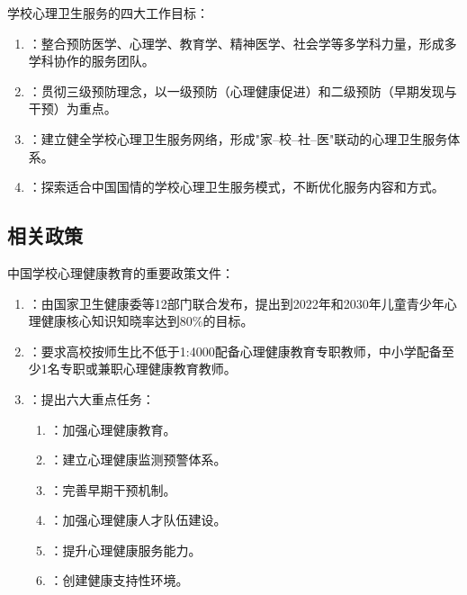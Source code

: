 \begin{keybox}
学校心理卫生服务的四大工作目标：

\begin{enumerate}[leftmargin=*]
    \item {}：整合预防医学、心理学、教育学、精神医学、社会学等多学科力量，形成多学科协作的服务团队。
    \item {}：贯彻三级预防理念，以一级预防（心理健康促进）和二级预防（早期发现与干预）为重点。
    \item {}：建立健全学校心理卫生服务网络，形成"家--校--社--医"联动的心理卫生服务体系。
    \item {}：探索适合中国国情的学校心理卫生服务模式，不断优化服务内容和方式。
\end{enumerate}
\end{keybox}

\subsection{相关政策}

\begin{defbox}
中国学校心理健康教育的重要政策文件：

\begin{enumerate}[leftmargin=*]
    \item {}：由国家卫生健康委等12部门联合发布，提出到2022年和2030年儿童青少年心理健康核心知识知晓率达到80\%的目标。
    \item {}：要求高校按师生比不低于1:4000配备心理健康教育专职教师，中小学配备至少1名专职或兼职心理健康教育教师。
    \item {}：提出六大重点任务：
    \begin{enumerate}
        \item {}：加强心理健康教育。
        \item {}：建立心理健康监测预警体系。
        \item {}：完善早期干预机制。
        \item {}：加强心理健康人才队伍建设。
        \item {}：提升心理健康服务能力。
        \item {}：创建健康支持性环境。
    \end{enumerate}
\end{enumerate}
\end{defbox}


